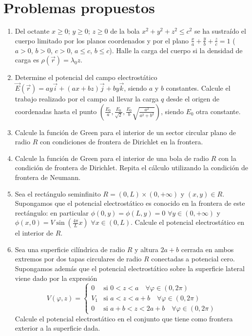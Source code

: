 \documentclass[12pt,a4paper]{book}
\begin{document}
\section{Problemas propuestos}

\begin{enumerate}
\item Del octante $x \geq 0$; $y \geq 0$; $z \geq 0$ de la bola $x^2 + y^2 + z^2 \leq c^2$ se ha sustraído el cuerpo limitado por los planos coordenados y por el plano $\frac{x}{a} + \frac{y}{b} + \frac{z}{c} = 1$ ($a > 0$, $b > 0$, $c > 0$, $a \leq c$, $b \leq c$). Halle la carga del cuerpo si la densidad de carga es $\rho(\vec{r}) = \lambda_0 z$.

\item Determine el potencial del campo electrostático $\vec{E}(\vec{r}) = ay\vec{i} + (ax + bz)\vec{j} + by\vec{k}$, siendo $a$ y $b$ constantes. Calcule el trabajo realizado por el campo al llevar la carga $q$ desde el origen de coordenadas hasta el punto $\left(\frac{E_0}{a}, \frac{E_0}{\sqrt{2}}, \frac{E_0}{b}\sqrt{\frac{a^2}{a^2+b^2}}\right)$, siendo $E_0$ otra constante.

\item Calcule la función de Green para el interior de un sector circular plano de radio $R$ con condiciones de frontera de Dirichlet en la frontera.

\item Calcule la función de Green para el interior de una bola de radio $R$ con la condición de frontera de Dirichlet. Repita el cálculo utilizando la condición de frontera de Neumann.

\item Sea el rectángulo seminfinito $R = (0, L) \times (0, +\infty)$ y $(x, y) \in R$. Supongamos que el potencial electrostático es conocido en la frontera de este rectángulo: en particular $\phi(0, y) = \phi(L, y) = 0$ $\forall y \in (0, +\infty)$ y $\phi(x, 0) = V\sin\left(\frac{4\pi}{L}x\right)$ $\forall x \in (0, L)$. Calcule el potencial electrostático en el interior de $R$.

\item Sea una superficie cilíndrica de radio $R$ y altura $2a + b$ cerrada en ambos extremos por dos tapas circulares de radio $R$ conectadas a potencial cero. Supongamos además que el potencial electrostático sobre la superficie lateral viene dado por la expresión
\begin{equation*}
V(\varphi, z) = 
\begin{cases}
0 & \text{si } 0 < z < a \quad \forall \varphi \in (0, 2\pi) \\
V_1 & \text{si } a < z < a + b \quad \forall \varphi \in (0, 2\pi) \\
0 & \text{si } a + b < z < 2a + b \quad \forall \varphi \in (0, 2\pi)
\end{cases}
\end{equation*}
Calcule el potencial electrostático en el conjunto que tiene como frontera exterior a la superficie dada.


\end{enumerate}
\end{document}
